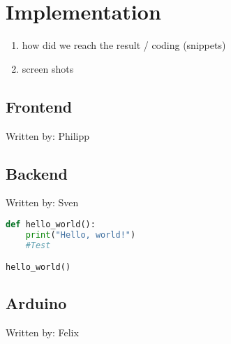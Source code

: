 \section{Implementation}
\begin{enumerate}
    \item how did we reach the result / coding (snippets)
    \item screen shots
\end{enumerate}

\subsection{Frontend}
{\tiny Written by: Philipp}

\subsection{Backend}
{\tiny Written by: Sven}

\lstset{language=Python, style=mystyle}
\begin{lstlisting}[language=Python]
def hello_world():
    print("Hello, world!")
    #Test

hello_world()
\end{lstlisting}

\subsection{Arduino}
{\tiny Written by: Felix}
